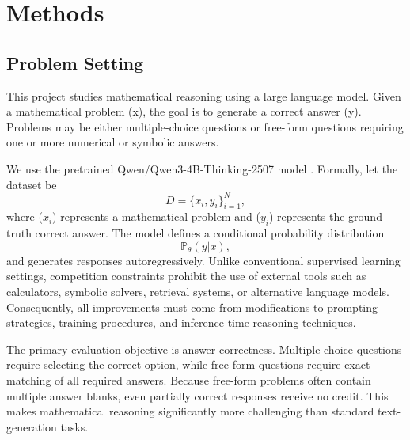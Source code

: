 \documentclass{article}
\begin{document}
\section{Methods}
\label{sec:methods}
\subsection{Problem Setting}
\label{sec:methods_setting}
This project studies mathematical reasoning using a large language model. Given a mathematical problem (x), the goal is to generate a correct answer (y). Problems may be either multiple-choice questions or free-form questions requiring one or more numerical or symbolic answers. 

We use the pretrained Qwen/Qwen3-4B-Thinking-2507 model \cite{qwen3}. Formally, let the dataset be
\begin{equation}
\label{eq:dataset}
D = \{x_i, y_i\}_{i=1}^N,
\end{equation}
where ($x_i$) represents a mathematical problem and ($y_i$) represents the ground-truth correct answer. The model defines a conditional probability distribution 
\begin{equation}
\label{eq:cond_prob}
\mathbb{P}_\theta(y | x),
\end{equation}
and generates responses autoregressively. Unlike conventional supervised learning settings, competition constraints prohibit the use of external tools such as calculators, symbolic solvers, retrieval systems, or alternative language models. Consequently, all improvements must come from modifications to prompting strategies, training procedures, and inference-time reasoning techniques.

The primary evaluation objective is answer correctness. Multiple-choice questions require selecting the correct option, while free-form questions require exact matching of all required answers. Because free-form problems often contain multiple answer blanks, even partially correct responses receive no credit. This makes mathematical reasoning significantly more challenging than standard text-generation tasks.
\end{document}

